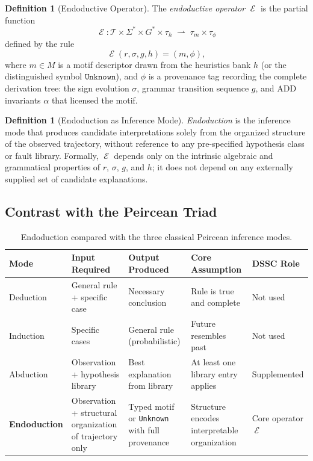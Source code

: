 \documentclass[11pt,a4paper]{article}
\theoremstyle{plain}
\theoremstyle{definition}
\newtheorem{definition}[theorem]{Definition}
\theoremstyle{remark}
\DeclareMathOperator{\Endo}{\mathcal{E}}
\begin{document}
\begin{definition}[Endoductive Operator]
\label{def:endoduction}
  The \emph{endoductive operator} $\Endo$ is the partial function
  \begin{equation}
    \Endo : \mathcal{T} \times \Sigma^* \times G^* \times \tau_h \;\rightharpoonup\; \tau_m \times \tau_\phi
  \end{equation}
  defined by the rule
  \begin{equation}
    \Endo(r, \sigma, g, h) = (m, \phi),
  \end{equation}
  where $m \in M$ is a motif descriptor drawn from the heuristics bank $h$ (or the distinguished
  symbol $\mathtt{Unknown}$), and $\phi$ is a provenance tag recording the complete derivation
  tree: the sign evolution $\sigma$, grammar transition sequence $g$, and ADD invariants $\alpha$
  that licensed the motif.
\end{definition}

\begin{definition}[Endoduction as Inference Mode]
\label{def:endoduction_mode}
  \emph{Endoduction} is the inference mode that produces candidate interpretations solely from
  the organized structure of the observed trajectory, without reference to any pre-specified
  hypothesis class or fault library. Formally, $\Endo$ depends only on the intrinsic algebraic
  and grammatical properties of $r$, $\sigma$, $g$, and $h$; it does not depend on any
  externally supplied set of candidate explanations.
\end{definition}

\subsection{Contrast with the Peircean Triad}

\begin{table}[H]
\centering
\caption{Endoduction compared with the three classical Peircean inference modes.}
\label{tab:inference_modes}
\small
\begin{tabularx}{\textwidth}{lXXXX}
\toprule
\textbf{Mode} & \textbf{Input Required} & \textbf{Output Produced} & \textbf{Core Assumption} & \textbf{DSSC Role} \\
\midrule
Deduction & General rule + specific case & Necessary conclusion & Rule is true and complete & Not used \\
Induction & Specific cases & General rule (probabilistic) & Future resembles past & Not used \\
Abduction & Observation + hypothesis library & Best explanation from library & At least one library entry applies & Supplemented \\
\textbf{Endoduction} & Observation + structural organization of trajectory only & Typed motif or \texttt{Unknown} with full provenance & Structure encodes interpretable organization & Core operator $\Endo$ \\
\bottomrule
\end{tabularx}
\end{table}
\end{document}
